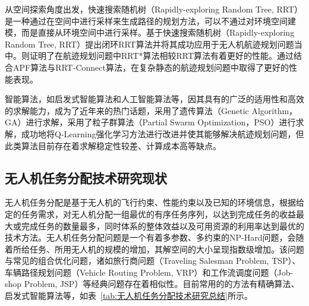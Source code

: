 从空间探索角度出发，快速搜索随机树（Rapidly-exploring Random Tree, RRT）是一种通过在空间中进行采样来生成路径的规划方法，可以不通过对环境空间建模，而是直接从环境空间中进行采样。\citet{lin2017SamplingBasedPathPlanning}基于快速搜索随机树（Rapidly-exploring Random Tree, RRT）提出闭环RRT算法并将其成功应用于无人机航迹规划问题当中。\citet{karaman2011SamplingbasedAlgorithmsOptimal}则证明了在航迹规划问题中RRT*算法相较RRT算法有着更好的性能。\citet{zhang2018ImprovedPathPlanninga}通过结合APF算法与RRT-Connect算法，在复杂静态的航迹规划问题中取得了更好的性能表现。

智能算法，如启发式智能算法和人工智能算法等，因其具有的广泛的适用性和高效的求解能力，成为了近年来的热门话题，\citet{sonmez2015OptimalPathPlanning}采用了遗传算法（Genetic Algorithm， GA）进行求解，\citet{wang2014ThreedimensionalPathPlanning}采用了粒子群算法（Partial Swarm Optimization，PSO）进行求解，\citet{yan2018PathPlanningAlgorithm}成功地将Q-Learning强化学习方法进行改进并使其能够解决航迹规划问题，但此类算法目前存在着求解稳定性较差、计算成本高等缺点。

\subsection{无人机任务分配技术研究现状}

无人机任务分配是基于无人机的飞行约束、性能约束以及已知的环境信息，根据给定的任务需求，对无人机分配一组最优的有序任务序列，以达到完成任务的收益最大或完成任务的数量最多，同时体系的整体效益以及可用资源的利用率达到最优的技术方法。无人机任务分配问题是一个有着多参数、多约束的NP-Hard问题\citep{ghazzai2019FutureUAVBasedITS}，会随着所给任务、所用无人机的规模的增加，其解空间的大小呈现指数级增加。该问题与常见的组合优化问题，诸如旅行商问题（Traveling Salesman Problem, TSP）、车辆路径规划问题（Vehicle Routing Problem, VRP）和工作流调度问题（Job-shop Problem, JSP）等经典问题存在着相似性。目前常用的的方法有精确算法、启发式智能算法等，如表~\ref{tab:无人机任务分配技术研究总结}所示。

